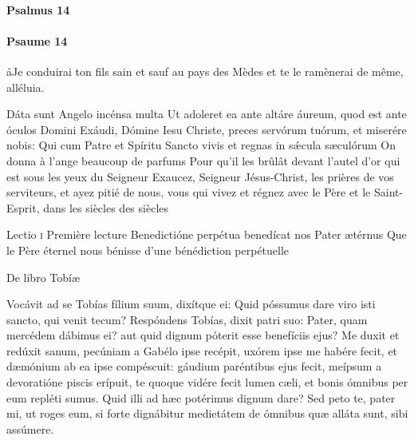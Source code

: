 \documentclass[twoside]{article}
\begin{document}
\begin{paracol}[1]{2}
\switchcolumn*

\paragraph{Psalmus 14}


\begin{enumerate}[wide, itemsep=0mm, labelwidth=!, labelindent=0pt, label=\color{gregoriocolor}\theenumi]

\end{enumerate}

\switchcolumn

\paragraph{Psaume 14}
\aa Je conduirai ton fils sain et sauf au pays des Mèdes et te le ramènerai de même, alléluia.


\begin{enumerate}[wide, itemsep=0mm, labelwidth=!, labelindent=0pt, label=\color{gregoriocolor}\theenumi]

\end{enumerate}

\switchcolumn*

\versiculusabsolutio
	{Dáta sunt Angelo incénsa multa}
	{Ut adoleret ea ante altáre áureum, quod est ante óculos Domini}
	{Exáudi, Dómine Iesu Christe, preces servórum tuórum, et miserére nobis: Qui cum Patre et Spíritu Sancto vivis et regnas in sǽcula sæculórum}
	{On donna à l’ange beaucoup de parfums}
	{Pour qu’il les brûlât devant l’autel d’or qui est sous les yeux du Seigneur}
	{Exaucez, Seigneur Jésus-Christ, les prières de vos serviteurs, et ayez pitié de nous, vous qui vivez et régnez avec le Père et le Saint-Esprit, dans les siècles des siècles}

\lectioresponsorium
	{Lectio \textsc{i}}
	{Première lecture}
	{Benedictióne perpétua benedícat nos Pater ætérnus}
	{Que le Père éternel nous bénisse d'une bénédiction perpétuelle}
	{
		De libro Tobíæ

		Vocávit ad se Tobías fílium suum, dixítque ei: Quid póssumus dare viro isti sancto, qui venit tecum?
		Respóndens Tobías, dixit patri suo: Pater, quam mercédem dábimus ei? aut quid dignum póterit esse benefíciis ejus?
		Me duxit et redúxit sanum, pecúniam a Gabélo ipse recépit, uxórem ipse me habére fecit, et dæmónium ab ea ipse compéscuit: gáudium paréntibus ejus fecit, meípsum a devoratióne piscis erípuit, te quoque vidére fecit lumen cæli, et bonis ómnibus per eum repléti sumus. Quid illi ad hæc potérimus dignum dare?
		Sed peto te, pater mi, ut roges eum, si forte dignábitur medietátem de ómnibus quæ alláta sunt, sibi assúmere.
	}
	{	
		
}
\end{paracol}
\end{document}
